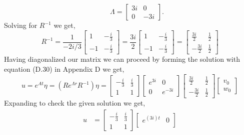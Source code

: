 \documentclass[12pt]{article}
\makeatletter
\theoremstyle{homework}
\newenvironment{exercise}[1]
{\def\@currentlabel{#1}\exercisecore}
{\endexercisecore}
\makeatother
\begin{document}
\begin{exercise}{Problem P26}
\begin{equation*}
    \qquad
    \Lambda = 
    \begin{bmatrix}
      3i & 0\\
      0 & -3i
    \end{bmatrix}.
  \end{equation*}
  Solving for $R^{-1}$ we get, 
  \begin{equation*}
    R^{-1} = \frac{1}{-2i/3} \begin{bmatrix}
      1 & -\frac{i}{3}\\
      -1 & -\frac{i}{3}
    \end{bmatrix} = \frac{3i}{2} \begin{bmatrix}
      1 & -\frac{i}{3}\\
      -1 & -\frac{i}{3}
    \end{bmatrix} = 
    \begin{bmatrix}
      \frac{3i}{2} & \frac{1}{2}\\
      -\frac{3i}{2} & \frac{1}{2}
    \end{bmatrix}
  \end{equation*}
  Having diagonalized our matrix we can proceed by forming the solution with equation (D.30) in Appendix D we get, 
  \begin{equation*}
    u = e^{At}\eta = (R e^{\Lambda r} R^{-1}) \eta =  \begin{bmatrix}
      -\frac{i}{3} & \frac{i}{3}\\
      1 & 1
    \end{bmatrix}
    \begin{bmatrix}
      e^{3i} & 0\\
      0 & e^{-3i}
    \end{bmatrix}
    \begin{bmatrix}
      \frac{3i}{2} & \frac{1}{2}\\
      -\frac{3i}{2} & \frac{1}{2}
    \end{bmatrix}
    \begin{bmatrix}
      v_0\\
      w_0
    \end{bmatrix}
  \end{equation*}
  Expanding to check the given solution we get, 
  \begin{align*}
    u &= \begin{bmatrix}
      -\frac{i}{3} & \frac{i}{3}\\
      1 & 1
    \end{bmatrix}
    \begin{bmatrix}
      e^{(3i)t} & 0\\

\end{bmatrix}
\end{align*}
\end{exercise}
\end{document}
